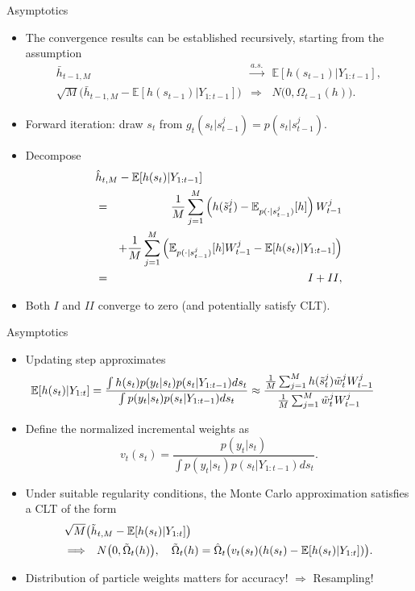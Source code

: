 \documentclass[presentation]{beamer}
\newcommand{\be}{\begin{equation}}
\newcommand{\ee}{\end{equation}}
\begin{document}
\begin{frame}[label={sec:org2a6594e}]{Asymptotics}
\begin{itemize}
	\item The convergence results can be established recursively, starting from the assumption
	\begin{eqnarray*}
		\bar{h}_{t-1,M} &\stackrel{a.s.}{\longrightarrow}& \mathbb{E}[h(s_{t-1})|Y_{1:t-1}], \\
		\sqrt{M} \big( \bar{h}_{t-1,M} - \mathbb{E}[h(s_{t-1})|Y_{1:t-1}] \big) &\Longrightarrow& N \big( 0, \Omega_{t-1}(h) \big). \nonumber
	\end{eqnarray*}
	\item Forward iteration: draw $s_t$ from $g_t(s_t|s_{t-1}^j)= p(s_t|s_{t-1}^j)$.
	\item Decompose
	\begin{eqnarray}
	\lefteqn{\hat{h}_{t,M} - \mathbb{E}[h(s_t)|Y_{1:t-1}]}  \label{eq_pfdecomphtt1} \\
	&=& \frac{1}{M} \sum_{j=1}^M  \left( h(\tilde{s}_t^j) - \mathbb{E}_{p(\cdot|s_{t-1}^j)}[h] \right) W_{t-1}^j \nonumber \\
	& & + \frac{1}{M} \sum_{j=1}^M  \left( \mathbb{E}_{p(\cdot|s_{t-1}^j)}[h] W_{t-1}^j
	- \mathbb{E}[h(s_t)|Y_{1:t-1}] \right)  \nonumber \\
	&=& I + II, \nonumber
	\end{eqnarray}
	\item Both $I$ and $II$ converge to zero (and potentially satisfy CLT).
\end{itemize}
\end{frame}

\begin{frame}[label={sec:orgfaaf464}]{Asymptotics}
\begin{itemize}
	\item Updating step approximates
	\be\hspace{-0.4in}
	\mathbb{E}[h(s_t)|Y_{1:t}]
	= \frac{ \int h(s_t) p(y_t|s_t) p(s_t |Y_{1:t-1}) d s_t }{
		\int p(y_t|s_t) p(s_t |Y_{1:t-1}) d s_t }
	\approx \frac{ \frac{1}{M} \sum_{j=1}^M h(\tilde{s}_t^j) \tilde{w}_t^j W_{t-1}^j }{
		\frac{1}{M} \sum_{j=1}^M \tilde{w}_t^j W_{t-1}^j} 
	\ee
	\item Define the normalized incremental weights as
	\be
	v_t(s_t) = \frac{p(y_t|s_t)}{\int p(y_t|s_t) p(s_t|Y_{1:t-1}) ds_t}.
	\label{eq_pfincrweightv}
	\ee
	\item Under suitable regularity conditions, the Monte Carlo approximation satisfies a CLT of the
	form
	\begin{eqnarray}
	\lefteqn{\sqrt{M} \big( \tilde{h}_{t,M} - \mathbb{E}[h(s_t)|Y_{1:t}] \big) } \label{eq_pftildehclt} \\
	&\Longrightarrow& N \big( 0, \tilde{\Omega}_t(h) \big), \quad
	\tilde{\Omega}_t(h) = \hat{\Omega}_t \big( v_t(s_t) ( h(s_t) - \mathbb{E}[h(s_t)|Y_{1:t}] )\big). \nonumber
	\end{eqnarray}
	\item Distribution of particle weights matters for accuracy! $\Longrightarrow$ Resampling!
\end{itemize}
\end{frame}
\end{document}
